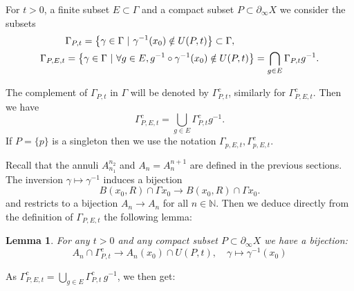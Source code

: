 \documentclass[12pt]{amsbook}%
\newtheorem{lem}[thm]{Lemma}
\theoremstyle{definition}
\theoremstyle{remark}
\newtheorem{rem}[thm]{Remark}
\numberwithin{section}{chapter}
\numberwithin{subsection}{section}
\numberwithin{figure}{chapter}
\newcommand\bac[1]{{\color{blue} #1} }
\def\uupt{U(P,t)}
\def\Uupt{U(P,t)}
\def\Ga{\Gamma}
\def\ga{\gamma}
\def\geo{\partial_\infty}
\def\ol{\overline}
\begin{document}
{{%

For $t >0$, a finite subset $E\subset \Gamma$ and a compact subset $P\subset \geo X$ we consider the subsets 
\begin{align} 
\begin{aligned}
\label{eq_Gpt}\index{$\Gamma_{P,t}$}
&\Gamma_{P,t} = \left \{ \gamma \in \Gamma \ | \ \gamma^{-1}(x_0) \notin U(P,t) \right \}\subset \Ga, 
\\
\Gamma_{P,E,t} &= \left \{ \gamma \in \Gamma \ | \ \forall g\in E, g^{-1}\circ\gamma^{-1}(x_0) \notin U(P,t) \right \} = 
\bigcap_{g\in E} \Gamma_{P,t}g^{-1}. 
\end{aligned}\index{$\Gamma_{P,E,t}$}
\end{align}

The complement of $\Gamma_{P,t}$ in $\Gamma$ will be denoted by $\Gamma_{P,t}^c$, similarly for $\Gamma_{P,E,t}^c$. Then we have
\[
\Gamma_{P,E,t}^c=\bigcup_{g\in E}\Gamma_{P,t}^cg^{-1}.
\] 
If $P=\{p\}$ is a singleton then we use the notation $\Gamma_{p,E,t},\Gamma_{p,E,t}^c$.


Recall that the annuli %
$A_{n_1}^{n_2}$ and $A_n=A_n^{n+1}$ are defined in the previous sections. 
The inversion $\gamma\mapsto \gamma^{-1}$ induces a bijection
$$
B(x_0, R)\cap \Ga x_0 \to B(x_0, R)\cap \Ga x_0. 
$$
and restricts to a bijection $A_n\to A_n$ for all $n\in \mathbb N$. Then we deduce directly from the definition of $\Gamma_{P,E,t}$ the following lemma:

\begin{lem}\label{lem:shadowcounting_inverse_singlepoint}
For any $t>0$ and any compact subset $P\subset \geo X$ we have a bijection:
\[
A_n \cap \Gamma_{P,t}^c \rightarrow A_n(x_0) \cap \Uupt,\quad \gamma\mapsto \gamma^{-1}(x_0)
\]
\end{lem}
As $\Gamma_{P,E,t}^c=\bigcup_{g\in E}\Gamma_{P,t}^c \,g^{-1}$, we then get:

}}
\end{document}

